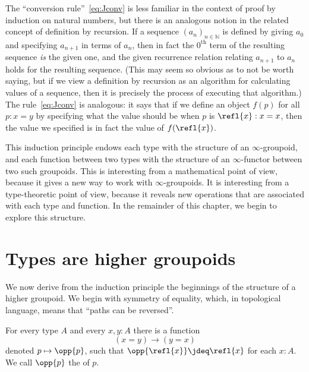 The ``conversion rule''~\eqref{eq:Jconv} is less familiar in the context of proof by induction on natural numbers, but there is an analogous notion in the related concept of definition by recursion.
If a sequence $(a_n)_{n\in \mathbb{N}}$ is defined by giving $a_0$ and specifying $a_{n+1}$ in terms of $a_n$, then in fact the $0^{\mathrm{th}}$ term of the resulting sequence \emph{is} the given one, and the given recurrence relation relating $a_{n+1}$ to $a_n$ holds for the resulting sequence.
(This may seem so obvious as to not be worth saying, but if we view a definition by recursion as an algorithm for calculating values of a sequence, then it is precisely the process of executing that algorithm.)
The rule~\eqref{eq:Jconv} is analogous: it says that if we define an object $f(p)$ for all $p:x=y$ by specifying what the value should be when $p$ is $\refl{x}:x=x$, then the value we specified is in fact the value of $f(\refl{x})$.

This induction principle endows each type with the structure of an $\infty$-groupoid, and each function between two types with the structure of an $\infty$-functor between two such groupoids.  This is interesting from a mathematical point of view, because it gives a new way to work with
$\infty$-groupoids.  It is interesting from a type-theoretic point of view, because it reveals new operations that are associated with each type and function.  In the remainder of this chapter, we begin to explore this structure.

\section{Types are higher groupoids}
\label{sec:equality}

%
%
%
We now derive from the induction principle the beginnings of the structure of a higher groupoid.
We begin with symmetry of equality, which, in topological language, means that ``paths can be reversed''.

\begin{lem}\label{lem:opp}
  For every type $A$ and every $x,y:A$ there is a function
  \begin{equation*}
    (x= y)\to(y= x)
  \end{equation*}
  denoted $p\mapsto \opp{p}$, such that $\opp{\refl{x}}\jdeq\refl{x}$ for each $x:A$.
  We call $\opp{p}$ the  of $p$.
\end{lem}

